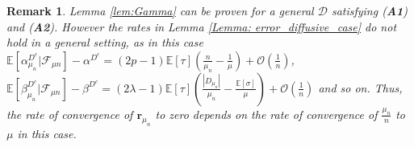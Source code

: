 \documentclass{article}
\numberwithin{equation}{section}
\newtheorem{remark}{Remark}
\newcommand{\GG}{\mbox{${\mathcal G}$}}
\newcommand{\FF}{\mbox{${\mathcal F}$}}
\newcommand{\OO}{\mbox{${\mathcal O}$}}
\newcommand{\DD}{\mbox{${\mathcal D}$}}
\newcommand{\1}{\mathbf{1}}
\newcommand{\0}{\mathbf{0}}
\newcommand{\br}{\mathbf{r}}
\newcommand{\E}{\mbox{${\mathbb E}$}}
\begin{document}
\begin{remark}
    Lemma \ref{lem:Gamma} can be proven for a general $\DD$ satisfying (\textbf{A1}) and (\textbf{A2}). However the rates in Lemma \ref{Lemma: error_diffusive_case} do not hold in a general setting, as in this case  $\E[\alpha_{\mu_n}^{D^c} \vert \FF_{\mu n}] - \alpha^{D^c} = (2p-1)\E[\tau]\left(\frac{n}{\mu_n} - \frac{1}{\mu}\right)  + \OO\left(\frac{1}{n}\right)$,  $\E[\beta_{\mu_n}^{D^c} \vert \FF_{\mu n}] - \beta^{D^c} = (2\lambda-1)\E[\tau]\left(\frac{|D_{\mu_n}|}{\mu_n} - \frac{\E[\sigma]}{\mu}\right) + \OO\left(\frac{1}{n}\right)$ and so on. Thus, the rate of convergence of $ \br_{ \mu_{n}}$ to zero depends on the rate of convergence of $\frac{\mu_n}{n}$ to $\mu$ in this case.
\end{remark}












\color{black}
\end{document}
